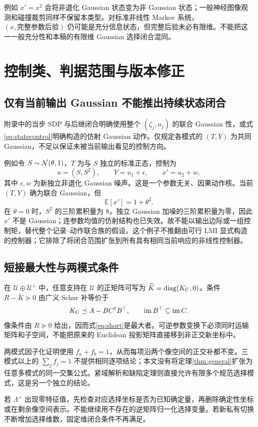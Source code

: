 \documentclass[UTF8,fontset=fandol,zihao=5,a4paper]{ctexart}
\newcommand{\E}{\mathbb E}\newcommand{\Pp}{\mathbb P}
\theoremstyle{definition}
\theoremstyle{remark}\newtheorem{remark}[theorem]{说明}
\numberwithin{equation}{section}
\begin{document}
例如 $x'=x^2$ 会将非退化 Gaussian 状态变为非 Gaussian 状态；一般神经图像观测和碰撞裁剪同样不保留本类型。对标准非线性 Markov 系统，$(x,\text{完整参数后验})$ 仍可能是充分信息状态，但完整后验未必有限维。不能把这一一般充分性和本稿的有限维 Gaussian 选择闭合混同。



\section{控制类、判据范围与版本修正}
\label{app:scope73}

\subsection{仅有当前输出 Gaussian 不能推出持续状态闭合}
附录中的当步 SDP 与后继闭合明确使用整个 $(\zeta_j,u_j)$ 的联合 Gaussian 性，或式\eqref{eq:statecontrol}明确构造的仿射 Gaussian 动作。仅规定各模式的 $(T,Y)$ 为共同 Gaussian，不足以保证未被当前输出看见的控制方向。

例如令 $S\sim\mathcal N(\theta,1)$，$T$ 为与 $S$ 独立的标准正态，控制为
\[
u=(S,S^2),\qquad Y=u_1+\epsilon,\qquad x'=u_2+w,
\]
其中 $\epsilon,w$ 为新独立非退化 Gaussian 噪声。这是一个参数无关、因果动作核。当前 $(T,Y)$ 确为联合 Gaussian，但
\[
\E[x']=1+\theta^2.
\]
在 $\theta=0$ 时，$S^2$ 的三阶累积量为 $8$，独立 Gaussian 加噪的三阶累积量为零，因此 $x'$ 不是 Gaussian；连参数均值的仿射结构也已失效。故不能以输出边际或一组控制矩，替代整个记录--动作联合族的假设。这个例子不推翻由可行 LMI 显式构造的控制器；它排除了将闭合范围扩张到所有具有相同当前响应的非线性控制器。

\subsection{短接最大性与两模式条件}
在 $\mathcal U\oplus\mathcal U^\perp$ 中，任意支持在 $\mathcal U$ 的正矩阵可写为 $\widetilde K=\operatorname{diag}(K_U,0)$。条件 $R-\widetilde K\succeq0$ 由广义 Schur 补等价于
\[
K_U\preceq A-BC^\dagger B^\top,\qquad
\operatorname{im} B^\top\subseteq\operatorname{im} C.
\]
像条件由 $R\succeq0$ 给出，因而式\eqref{eq:short}是最大者。可逆参数变换下必须同时运输矩阵和子空间，不能把原来的 Euclidean 投影矩阵直接移到非正交新坐标中。

两模式因子化证明使用 $f_a+f_b=1$，从而每项沿两个像空间的正交补都不变。三模式以上的 $\sum_jf_j=1$ 不提供相同逐项结论；本文没有将定理\ref{thm:general}扩张为任意多模式的同一交集公式。紧域解析和缺陷定理则直接允许有限多个规范选择模式，这是另一个独立的结论。

若 $\Lambda^+$ 出现零特征值，先检查对应选择坐标是否为已知确定量，再删除确定性坐标或在剩余像空间表示。不能继续用不存在的逆矩阵归一化选择变量。若新私有切换不断增加选择维数，固定维闭合条件不再满足。
\end{document}
